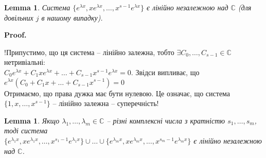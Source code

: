 \documentclass[a4paper, 10pt]{article}
\makeatletter
\def\qed{$\blacksquare$}
\theoremstyle{theoremdd}
\theoremstyle{theoremdd}
\theoremstyle{theoremdd}
\theoremstyle{theoremdd}
\theoremstyle{theoremdd}
\theoremstyle{theoremdd}
\theoremstyle{theoremdd}
\newtheorem{lemma}[theorem]{Lemma}
\theoremstyle{theoremdd}
\renewenvironment{proof}[1][Proof.\\]{\par
\pushQED{\hfill \qed}%
\normalfont \topsep6\p@\@plus6\p@\relax
\trivlist
\item\relax
{\bfseries
#1\@addpunct{.}}\hspace\labelsep\ignorespaces
}{%
\popQED\endtrivlist\@endpefalse
}
\makeatother
\begin{document}
\begin{lemma}
Система $\{e^{\lambda x}, x e^{\lambda x}, \dots, x^{s-1} e^{\lambda x}\}$ є лінійно незалежною над $\mathbb{C}$ (для довільних $j$ в нашому випадку).
\end{lemma}

\begin{proof}
!Припустимо, що ця система -- лінійно залежна, тобто $\exists C_0, \dots, C_{s-1} \in \mathbb{C}$ нетривіальні: \\
$C_0e^{\lambda x} + C_1 xe^{\lambda x} + \dots + C_{s-1} x^{s-1}e^{\lambda x} = 0$. Звідси випливає, що \\
$e^{\lambda x} (C_0 + C_1x + \dots + C_{s-1}x^{s-1}) = 0$\\
Отримаємо, що права дужка має бути нулевою. Це означає, що система $\{1, x, \dots, x^{s-1}\}$ -- лінійно залежна -- суперечність!
\end{proof}

\begin{lemma}
 Якщо $\lambda_1, \dots, \lambda_m \in \mathbb{C}$ -- різні комплексні числа з кратністю $s_1, \dots, s_m$, тоді система\\
$\{e^{\lambda_1 x}, x e^{\lambda_1 x}, \dots, x^{s_1-1} e^{\lambda_1 x}\} \cup \dots \cup \{e^{\lambda_m x}, x e^{\lambda_m x}, \dots, x^{s_m-1} e^{\lambda_m x}\}$ є лінійно незалежною над $\mathbb{C}$.
\end{lemma}
\end{document}
